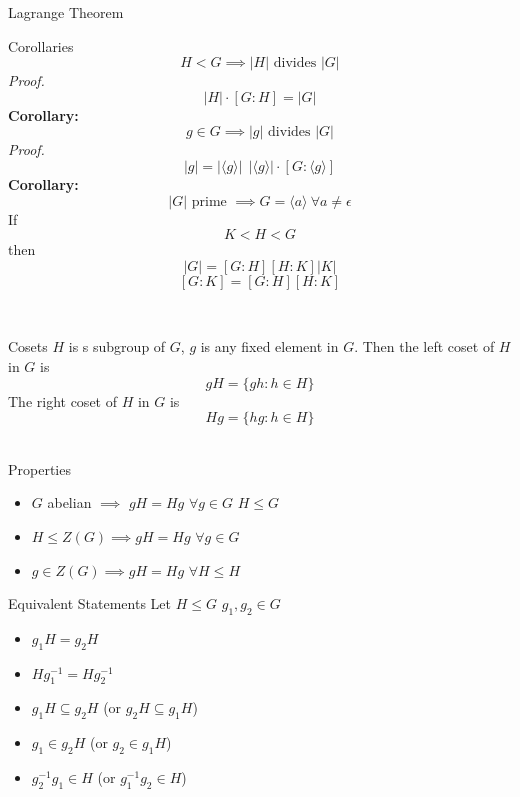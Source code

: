 \documentclass{article}
\begin{document}
\begin{multicols*}{3}
\begin{blackbox}{Lagrange Theorem}
\begin{bluebox}{Corollaries}
        \[H <  G \implies |H| \text{ divides } |G|\]
        \textit{Proof. } \\[-2ex]
        $$|H| \cdot [G : H]  = |G|$$
        \textbf{Corollary:}\\[-2ex]
        \[g \in G \implies |g| \text{ divides } |G|\]
        \textit{Proof. }\\[-2ex]
        \[|g| = |\langle {g} \rangle| \ \ |\langle {g} \rangle| \cdot [G : \langle {g} \rangle]\]
        \textbf{Corollary:}\\[-2ex]
        \[|G| \text{ prime } \implies G = \langle a \rangle \ \forall a \neq \epsilon\]
        If 
        \[K < H < G\]
        then 
        \[|G| = [G : H][H : K] |K|\]
        \[[G:K] = [G:H][H:K]\]
    \end{bluebox}\\[-2ex]
\end{blackbox}
\begin{blackbox}{Cosets}
    $H$ is s subgroup of $G$, $g$ is any fixed element in $G$. Then the left coset of $H$ in $G$ is \\[-2ex]
    \[gH = \{gh: h \in H\}\]
    The right coset of $H$ in $G$ is \\[-2ex]
    \[Hg = \{hg: h \in H\}\]\\[-4ex]
    \begin{redbox}{Properties}
    \begin{itemize}
        \item $G$ abelian $\implies$ $gH = Hg$ $\forall g \in G$ $H \leq G$
        \item $H \leq Z(G) \implies gH = Hg$ $\forall g \in G$
        \item $g \in Z(G) \implies gH = Hg$ $\forall H \leq H$  
    \end{itemize}
    \begin{bluebox}{Equivalent Statements}
        Let $H \leq G$ $g_1, g_2 \in G$
        \begin{itemize}
            \item $g_1H = g_2H$ 
            \item $Hg_1^{-1} = Hg_2^{-1}$
            \item $g_1H \subseteq g_2H$ (or $g_2H \subseteq g_1H$)
            \item $g_1 \in g_2H$ (or $g_2 \in g_1H$)
            \item $g_2^{-1}g_1 \in H$ (or $g_1^{-1}g_2 \in H$)
        \end{itemize}
    \end{bluebox}
    \end{redbox}\\[-2ex]
\end{blackbox}
\end{multicols*}
\end{document}
